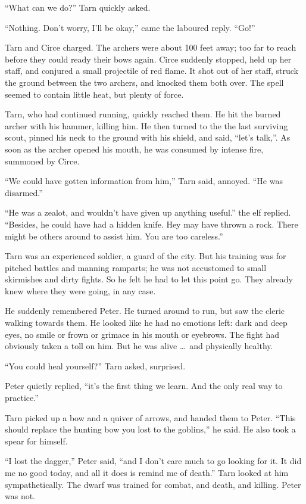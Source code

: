 ``What can we do?'' Tarn quickly asked.

``Nothing.  Don't worry, I'll be okay,'' came the laboured reply.  ``Go!''

Tarn and Circe charged.  The archers were about 100 feet away; too far to reach before they could ready their bows again.  Circe suddenly stopped, held up her staff, and conjured a small projectile of red flame.  It shot out of her staff, struck the ground between the two archers, and knocked them both over.  The spell seemed to contain little heat, but plenty of force.

Tarn, who had continued running, quickly reached them.  He hit the burned archer with his hammer, killing him.  He then turned to the the last surviving scout, pinned his neck to the ground with his shield, and said, ``let's talk,''.  As soon as the archer opened his mouth, he was consumed by intense fire, summoned by Circe.

``We could have gotten information from him,'' Tarn said, annoyed.  ``He was disarmed.''

``He was a zealot, and wouldn't have given up anything useful.''  the elf replied.  ``Besides, he could have had a hidden knife.  Hey may have thrown a rock.  There might be others around to assist him.  You are too careless.''

Tarn was an experienced soldier, a guard of the city.  But his training was for pitched battles and manning ramparts; he was not accustomed to small skirmishes and dirty fights.  So he felt he had to let this point go.  They already knew where they were going, in any case.

He suddenly remembered Peter.  He turned around to run, but saw the cleric walking towards them.  He looked like he had no emotions left: dark and deep eyes, no smile or frown or grimace in his mouth or eyebrows.  The fight had obviously taken a toll on him.  But he was alive \ldots\ and physically healthy.

``You could heal yourself?'' Tarn asked, surprised.

Peter quietly replied, ``it's the first thing we learn.  And the only real way to practice.''

Tarn picked up a bow and a quiver of arrows, and handed them to Peter.  ``This should replace the hunting bow you lost to the goblins,'' he said.  He also took a spear for himself.

``I lost the dagger,'' Peter said, ``and I don't care much to go looking for it.  It did me no good today, and all it does is remind me of death.''  Tarn looked at him sympathetically.  The dwarf was trained for combat, and death, and killing.  Peter was not.




